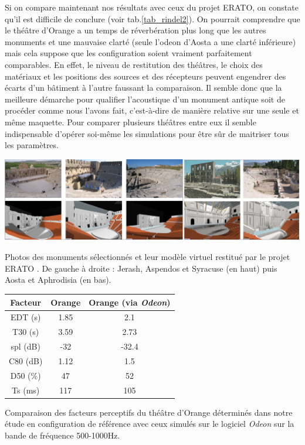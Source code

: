 Si on compare maintenant nos résultats avec ceux du projet ERATO, on constate qu'il est difficile de conclure (voir tab.\ref{tab_rindel2}). On pourrait comprendre que le théâtre d'Orange a un temps de réverbération plus long que les autres monuments et une mauvaise clarté (seule l'\gls{odeon} d'Aosta a une clarté inférieure) mais cela suppose que les configuration soient vraiment parfaitement comparables. En effet, le niveau de restitution des théâtres, le choix des matériaux et les positions des sources et des récepteurs peuvent engendrer des écarts d'un bâtiment à l'autre faussant la comparaison. Il semble donc que la meilleure démarche pour qualifier l'acoustique d'un monument antique soit de procéder comme nous l'avons fait, c'est-à-dire de manière relative sur une seule et même maquette. Pour comparer plusieurs théâtres entre eux il semble indispensable d'opérer soi-même les simulations pour être sûr de maitriser tous les paramètres. 
%
\begin{figureth}
	\includegraphics[width=0.8\linewidth]{images/rindel}
	\caption[Photos des monuments sélectionnés et leur modèle virtuel restitué par le projet ERATO.]{Photos des monuments sélectionnés et leur modèle virtuel restitué par le projet ERATO \footnotemark. De gauche à droite : Jerash, Aspendos et Syracuse (en haut) puis Aosta et Aphrodisia (en bas).}
	\label{rindel}
\end{figureth}
%
\begin{tableth}
 \begin{tabular}{| *{3}{c|}} 
 \hline 
 Facteur & Orange & Orange (via \textit{Odeon})   \\ 
 \hline 
 \hline 
  \gls{EDT} (s)& 1.85& 2.1 \\ 
 \hline 
\gls{T30} (s)& 3.59&  2.73\\ 
 \hline 
\gls{spl} (dB) &-32 & -32.4\\ 
 \hline 
\gls{C80} (dB)& 1.12&1.5  \\ 
 \hline 
\gls{D50} (\%)&47 & 52 \\ 
 \hline 
\gls{Ts} (ms)&117 & 105 \\ 
 \hline 
\end{tabular} 
 \caption{Comparaison des facteurs perceptifs du théâtre d'Orange déterminés dans notre étude en configuration de référence avec ceux simulés sur le logiciel \textit{Odeon} sur la bande de fréquence 500-1000Hz.}
 \label{tab_rindel} 
 \end{tableth}
 
